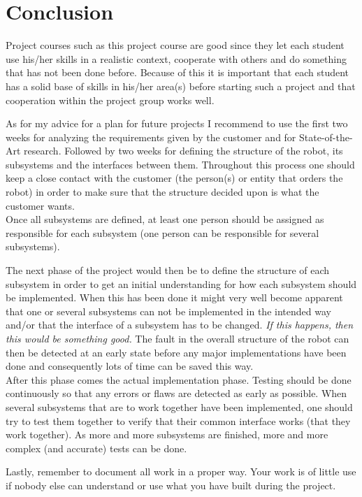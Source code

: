 \section{Conclusion}\label{sec:conclusion}
Project courses such as this project course are good since they let each student use his/her skills in a realistic context, cooperate with others and do something that has not been done before. Because of this it is important that each student has a solid base of skills in his/her area(s) before starting such a project and that cooperation within the project group works well.
\pagebreak

As for my advice for a plan for future projects I recommend to use the first two weeks for analyzing the requirements given by the customer and for State-of-the-Art research. Followed by two weeks for defining the structure of the robot, its subsystems and the interfaces between them. Throughout this process one should keep a close contact with the customer (the person(s) or entity that orders the robot) in order to make sure that the structure decided upon is what the customer wants. \\
Once all subsystems are defined, at least one person should be assigned as responsible for each subsystem (one person can be responsible for several subsystems).

The next phase of the project would then be to define the structure of each subsystem in order to get an initial understanding for how each subsystem should be implemented. When this has been done it might very well become apparent that one or several subsystems can not be implemented in the intended way and/or that the interface of a subsystem has to be changed.\emph{ If this happens, then this would be something good.} The fault in the overall structure of the robot can then be detected at an early state before any major implementations have been done and consequently lots of time can be saved this way. \\
After this phase comes the actual implementation phase. Testing should be done continuously so that any errors or flaws are detected as early as possible. When several subsystems that are to work together have been implemented, one should try to test them together to verify that their common interface works (that they work together). As more and more subsystems are finished, more and more complex (and accurate) tests can be done.

Lastly, remember to document all work in a proper way. Your work is of little use if nobody else can understand or use what you have built during the project.